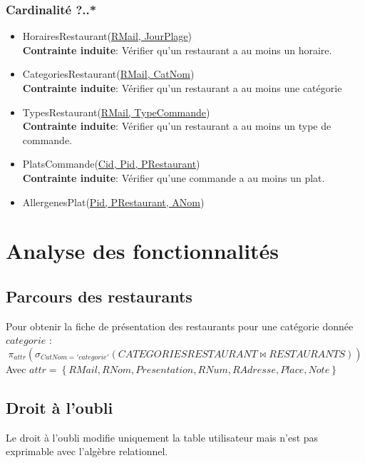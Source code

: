 \documentclass[10pt, a4paper]{article}
\begin{document}
\subsubsection{Cardinalité ?..*}

\begin{itemize}
    \item HorairesRestaurant\@(\underline{RMail, JourPlage})\\
          \textbf{Contrainte induite}: Vérifier qu'un restaurant a au moins un horaire.
    \item CategoriesRestaurant\@(\underline{RMail, CatNom})\\
          \textbf{Contrainte induite}: Vérifier qu'un restaurant a au moins une catégorie
    \item TypesRestaurant\@(\underline{RMail, TypeCommande})\\
          \textbf{Contrainte induite}: Vérifier qu'un restaurant a au moins un type de commande.
    \item PlatsCommande\@(\underline{Cid, Pid, PRestaurant})\\
          \textbf{Contrainte induite}: Vérifier qu'une commande a au moins un plat.
    \item AllergenesPlat\@(\underline{Pid, PRestaurant, ANom})
\end{itemize}


\section{Analyse des fonctionnalités}
\subsection{Parcours des restaurants}
Pour obtenir la fiche de présentation des restaurants pour une catégorie donnée $categorie$ :
$$
    \pi_{attr}(\sigma_{CatNom = 'categorie'}(CATEGORIESRESTAURANT \Join RESTAURANTS))
$$
Avec $attr = \left\{ RMail, RNom, Presentation, RNum, RAdresse, Place, Note \right\}$

\subsection{Droit à l'oubli}
Le droit à l'oubli modifie uniquement la table utilisateur mais n'est pas exprimable
avec l'algèbre relationnel.
\end{document}

